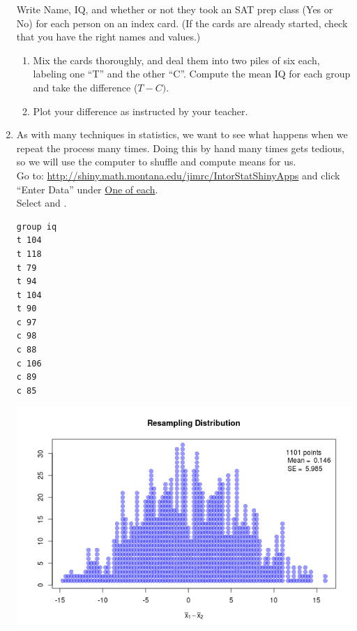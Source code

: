 \begin{enumerate}
Write Name, IQ, and whether or not they took an SAT prep class (Yes or
No) for each person on an index card.
(If the cards are already started, check that you have the right
names and values.)  
   \begin{enumerate}
   \item Mix the cards thoroughly, and deal them into two piles of six
     each, labeling one ``T'' and the other ``C''.
     Compute the mean IQ for each group and take the difference
     ($T - C)$.\vspace{1cm}
   \item Plot your difference as instructed by your teacher. \vspace{1cm} 
\end{enumerate}

\item As with many techniques in statistics, we want to see what
  happens when we repeat the process many times.  Doing this by hand
  many times gets tedious, so we will use the computer to shuffle and
  compute means for us. \\ Go to:
  \url{http://shiny.math.montana.edu/jimrc/IntorStatShinyApps} and click
  ``Enter Data'' under \underline{One of each}. \\
   Select  and .
 \begin{minipage}{.50\linewidth}
{\footnotesize
\begin{verbatim}
group iq
t 104
t 118
t 79
t 94
t 104
t 90
c 97
c 98
c 88
c 106
c 89
c 85
\end{verbatim}
}
 \end{minipage}
\begin{key}
  \begin{minipage}{.50\linewidth}
    \includegraphics[width=\linewidth]{plots/IQ-shuffle.png}
  \end{minipage}
\end{key}


\end{enumerate}
